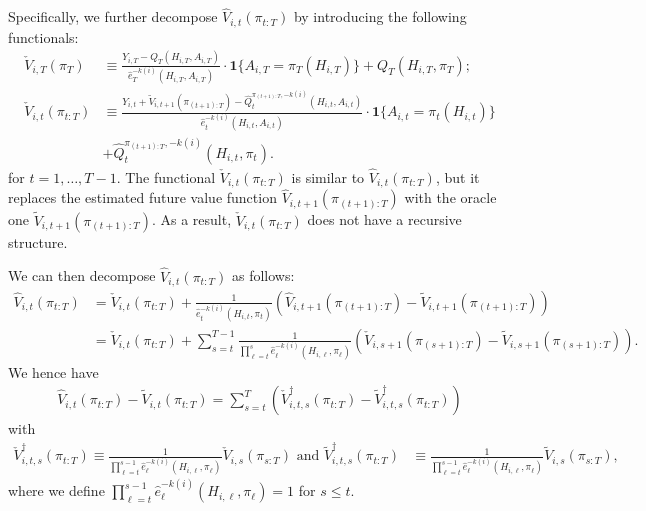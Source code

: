 Specifically, we further decompose $\widehat{V}_{i,t}(\pi_{t:T})$ by introducing the following functionals:
\begin{align*}
\check{V}_{i,T}(\pi_T) &\equiv \frac{ Y_{i,T}- Q_{T}(H_{i,T},A_{i,T}) }{\hat{e}_{T}^{-k(i)}(H_{i,T},A_{i,T})}\cdot\mathbf{1}\{A_{i,T} = \pi_{T}(H_{i,T})\} 
+  Q_{T}\left(H_{i,T},\pi_{T}\right);\\
    \check{V}_{i,t}(\pi_{t:T}) &\equiv \frac{Y_{i,t} + \widetilde{V}_{i,t+1}(\pi_{(t+1):T}) - \widehat{Q}_{t}^{\pi_{(t+1):T},-k(i)}(H_{i,t},A_{i,t}) }{\hat{e}_{t}^{-k(i)}(H_{i,t},A_{i,t})}\cdot \mathbf{1}\{A_{i,t}=\pi_{t}(H_{i,t})\} \nonumber\\
&+ \widehat{Q}_{t}^{\pi_{(t+1):T},-k(i)}(H_{i,t},\pi_{t}).
\end{align*}
for $t=1,\ldots,T-1$. The functional $\check{V}_{i,t}(\pi_{t:T})$ is similar to $\widehat{V}_{i,t}(\pi_{t:T})$, but it replaces the estimated future value function $\widehat{V}_{i,t+1}(\pi_{(t+1):T})$ with the oracle one $\widetilde{V}_{i,t+1}(\pi_{(t+1):T})$. As a result, $\check{V}_{i,t}(\pi_{t:T})$ does not have a recursive structure.

We can then decompose $\widehat{V}_{i,t}(\pi_{t:T})$ as follows:
\begin{align*}
    \widehat{V}_{i,t}(\pi_{t:T}) &= \check{V}_{i,t}(\pi_{t:T}) + \frac{1}{\hat{e}_{t}^{-k(i)}(H_{i,t},\pi_{t})}\left(\widehat{V}_{i,t+1}(\pi_{(t+1):T}) - \widetilde{V}_{i,t+1}(\pi_{(t+1):T})\right) \\
    &= \check{V}_{i,t}(\pi_{t:T}) + \sum_{s=t}^{T-1}\frac{1}{\prod_{\ell=t}^{s} \hat{e}_{\ell}^{-k(i)}(H_{i,\ell},\pi_{\ell})}\left(\check{V}_{i,s+1}(\pi_{(s+1):T}) - \widetilde{V}_{i,s+1}(\pi_{(s+1):T})\right).
\end{align*}
We hence have
\begin{align}
   \widehat{V}_{i,t}(\pi_{t:T}) - \widetilde{V}_{i,t}(\pi_{t:T}) = \sum_{s=t}^{T}\left(\check{V}_{i,t,s}^{\dagger}(\pi_{t:T}) - \widetilde{V}_{i,t,s}^{\dagger}(\pi_{t:T})\right) \label{eq:V_dif_decomposition}
\end{align}
with  %
\begin{align*}
    \check{V}_{i,t,s}^{\dagger}(\pi_{t:T}) \equiv \frac{1}{\prod_{\ell=t}^{s-1} \hat{e}_{\ell}^{-k(i)}(H_{i,\ell},\pi_{\ell})}\check{V}_{i,s}(\pi_{s:T}) \mbox{\ \ and\ \ }
    \widetilde{V}_{i,t,s}^{\dagger}(\pi_{t:T}) &\equiv \frac{1}{\prod_{\ell=t}^{s-1} \hat{e}_{\ell}^{-k(i)}(H_{i,\ell},\pi_{\ell})} \widetilde{V}_{i,s}(\pi_{s:T}),
\end{align*}
where we define $\prod_{\ell=t}^{s-1} \hat{e}_{\ell}^{-k(i)}(H_{i,\ell},\pi_{\ell}) = 1$ for $s \leq t$.

